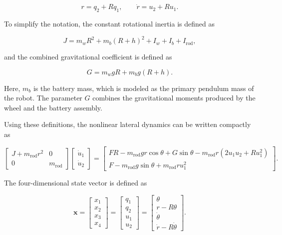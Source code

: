 \begin{equation}
r=q_2+Rq_1,
\qquad
\dot{r}=u_2+Ru_1.
\label{eq:rod-position-recovery}
\end{equation}

To simplify the notation, the constant rotational inertia is defined as

\begin{equation}
J
=
m_wR^2
+
m_b(R+h)^2
+
I_w
+
I_b
+
I_{\mathrm{rod}},
\label{eq:constant-J}
\end{equation}

and the combined gravitational coefficient is defined as

\begin{equation}
G
=
m_wgR
+
m_bg(R+h).
\label{eq:constant-G}
\end{equation}

Here, $m_b$ is the battery mass, which is modeled as the primary pendulum mass of the robot. The parameter $G$ combines the gravitational moments produced by the wheel and the battery assembly.

Using these definitions, the nonlinear lateral dynamics can be written compactly as

\begin{equation}
\begin{bmatrix}
J+m_{\mathrm{rod}}r^2 & 0 \\
0 & m_{\mathrm{rod}}
\end{bmatrix}
\begin{bmatrix}
\dot{u}_1 \\
\dot{u}_2
\end{bmatrix}
=
\begin{bmatrix}
FR
-m_{\mathrm{rod}}gr\cos\theta
+G\sin\theta
-m_{\mathrm{rod}}r
\left(
2u_1u_2+Ru_1^2
\right)
\\[6pt]
F
-m_{\mathrm{rod}}g\sin\theta
+m_{\mathrm{rod}}ru_1^2
\end{bmatrix}.
\label{eq:simplified-lateral-model}
\end{equation}

The four-dimensional state vector is defined as

\begin{equation}
\mathbf{x}
=
\begin{bmatrix}
x_1 \\
x_2 \\
x_3 \\
x_4
\end{bmatrix}
=
\begin{bmatrix}
q_1 \\
q_2 \\
u_1 \\
u_2
\end{bmatrix}
=
\begin{bmatrix}
\theta \\
r-R\theta \\
\dot{\theta} \\
\dot{r}-R\dot{\theta}
\end{bmatrix}.
\label{eq:lateral-state-vector}
\end{equation}

